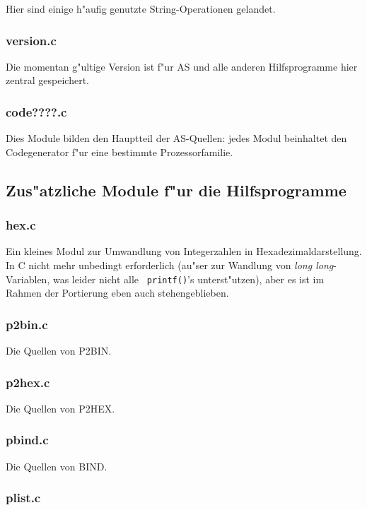 \documentclass[12pt,a4paper,twoside]{report}
\begin{document}
Hier sind einige h"aufig genutzte String-Operationen gelandet.

\subsubsection{version.c}

Die momentan g"ultige Version ist f"ur AS und alle anderen Hilfsprogramme
hier zentral gespeichert.

\subsubsection{code????.c}

Dies Module bilden den Hauptteil der AS-Quellen: jedes Modul beinhaltet
den Codegenerator f"ur eine bestimmte Prozessorfamilie.

\subsection{Zus"atzliche Module f"ur die Hilfsprogramme}

\subsubsection{hex.c}

Ein kleines Modul zur Umwandlung von Integerzahlen in
Hexadezimaldarstellung.  In C nicht mehr unbedingt erforderlich (au"ser
zur Wandlung von {\em long long}-Variablen, was leider nicht alle {\tt
printf()}'s unterst"utzen), aber es ist im Rahmen der Portierung eben auch
stehengeblieben.

\subsubsection{p2bin.c}

Die Quellen von P2BIN.

\subsubsection{p2hex.c}

Die Quellen von P2HEX.

\subsubsection{pbind.c}

Die Quellen von BIND.

\subsubsection{plist.c}
\end{document}
